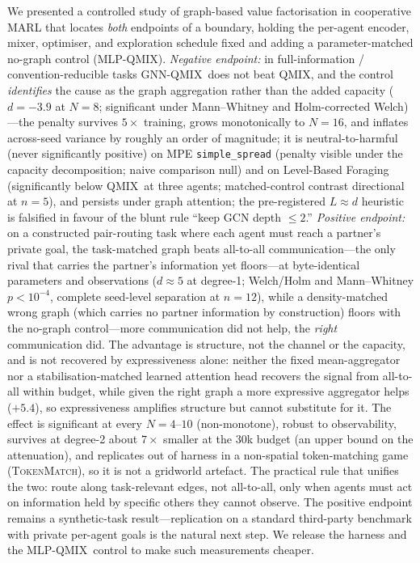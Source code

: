 \documentclass[manuscript, screen, review]{jair}
\newcommand{\algoname}[1]{\textsc{#1}}
\newcommand{\qmix}{\algoname{QMIX}}
\newcommand{\gnnqmix}{\algoname{GNN-QMIX}}
\newcommand{\mlpqmix}{\algoname{MLP-QMIX}}
\newcommand{\PEgraphDNeight}{-3.9}    %
\newcommand{\SCnbrShrink}{7}          %
\newcommand{\tokenmatch}{\textsc{TokenMatch}}
\begin{document}
We presented a controlled study of graph-based value factorisation in
cooperative MARL that locates \emph{both} endpoints of a boundary, holding
the per-agent encoder, mixer, optimiser, and exploration schedule fixed and
adding a parameter-matched no-graph control (\mlpqmix). \emph{Negative
endpoint:} in full-information / convention-reducible tasks \gnnqmix\ does not
beat \qmix, and the control \emph{identifies} the cause as the graph
aggregation rather than the added capacity ($d=\PEgraphDNeight$ at $N{=}8$;
significant under Mann--Whitney and Holm-corrected Welch)---the penalty
survives $5\times$ training, grows monotonically to $N{=}16$, and inflates
across-seed variance by roughly an order of magnitude; it is neutral-to-harmful (never
significantly positive) on MPE \texttt{simple\_spread} (penalty visible under
the capacity decomposition; naive comparison null) and on Level-Based Foraging
(significantly below \qmix\ at three agents; matched-control contrast
directional at $n{=}5$), and persists under graph attention; the pre-registered
$L\approx d$ heuristic is falsified in favour of the blunt rule ``keep GCN
depth $\le 2$.'' \emph{Positive endpoint:} on a constructed pair-routing task
where each agent must reach a partner's private goal, the task-matched graph
beats all-to-all communication---the only rival that carries the partner's
information yet floors---at byte-identical parameters and observations
($d\approx5$ at degree-1; Welch/Holm and Mann--Whitney $p<10^{-4}$, complete
seed-level separation at $n{=}12$), while a density-matched wrong graph
(which carries no partner information by construction) floors with the no-graph
control---more communication did not help, the \emph{right} communication did.
The advantage is structure, not the channel or the capacity, and is not
recovered by expressiveness alone: neither the fixed mean-aggregator nor a
stabilisation-matched learned attention head recovers the signal from
all-to-all within budget, while given the right graph a more expressive
aggregator helps ($+5.4$), so expressiveness amplifies structure but cannot
substitute for it. The effect is significant at every
$N{=}4$--$10$ (non-monotone), robust to observability, survives at degree-2
about $\SCnbrShrink\times$ smaller at the 30k budget (an upper bound on the
attenuation), and replicates out of harness in a
non-spatial token-matching game (\tokenmatch), so it is not a gridworld
artefact. The practical rule that unifies the two: route along task-relevant
edges, not all-to-all, only when agents must act on information held by
specific others they cannot observe. The positive endpoint remains a
synthetic-task result---replication on a standard third-party benchmark with
private per-agent goals is the natural next step. We release the harness and
the \mlpqmix\ control to make such measurements cheaper.
\end{document}
